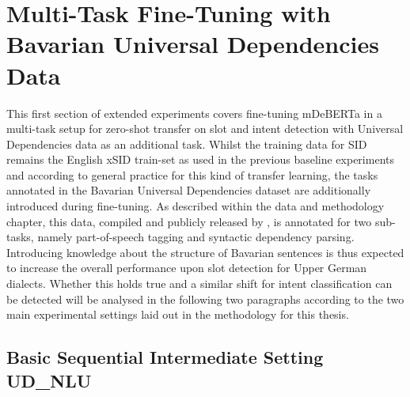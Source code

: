 \documentclass[11pt,a4paper,twoside,openright]{scrbook}
\begin{document}
\section{Multi-Task Fine-Tuning with Bavarian Universal Dependencies Data}

This first section of extended experiments covers fine-tuning mDeBERTa in a multi-task setup for zero-shot transfer on slot and intent detection with Universal Dependencies data as an additional task. Whilst the training data for SID remains the English xSID train-set as used in the previous baseline experiments and according to general practice for this kind of transfer learning, the tasks annotated in the Bavarian Universal Dependencies dataset are additionally introduced during fine-tuning. As described within the data and methodology chapter, this data, compiled and publicly released by \citet{blaschke-etal-2024-maibaam-multi}, is annotated for two sub-tasks, namely part-of-speech tagging and syntactic dependency parsing. Introducing knowledge about the structure of Bavarian sentences is thus expected to increase the overall performance upon slot detection for Upper German dialects. Whether this holds true and a similar shift for intent classification can be detected will be analysed in the following two paragraphs according to the two main experimental settings laid out in the methodology for this thesis.






\subsection{Basic Sequential Intermediate Setting UD\_NLU}
\end{document}
